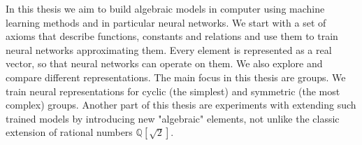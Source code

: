\documentclass[12pt]{other}
\begin{document}
In this thesis we aim to build algebraic models in computer using machine learning methods and in particular neural networks. We start with a set of axioms that describe functions, constants and relations and use them to train neural networks approximating them. Every element is represented as a real vector, so that neural networks can operate on them. We also explore and compare different representations. The main focus in this thesis are groups. We train neural representations for cyclic (the simplest) and symmetric (the most complex) groups. Another part of this thesis  are experiments with extending such trained models by introducing new "algebraic" elements, not unlike the classic extension of rational numbers $\mathbb{Q}[\sqrt{2}]$. 
\end{document}
